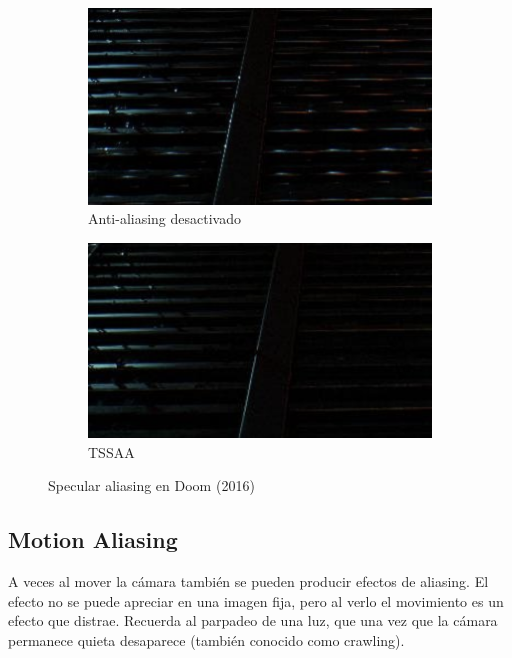 \documentclass[withindex, glossary]{cam-thesis}
\begin{document}
\begin{figure}[!htbp]
    \centering
    \begin{subfigure}[b]{0.8\textwidth}
        \includegraphics[width=\textwidth]{figures/specular-aliasing.png}
        \caption{Anti-aliasing desactivado}
    \end{subfigure}
    \centering
    \begin{subfigure}[b]{0.8\textwidth}
        \includegraphics[width=\textwidth]{figures/specular-fixed.png}
        \caption{TSSAA}
    \end{subfigure}
    \caption{Specular aliasing en Doom (2016)\label{specular}}
\end{figure}

\subsection{Motion Aliasing}

A veces al mover la cámara también se pueden producir efectos de aliasing. El efecto no se puede apreciar en una imagen fija, pero al verlo el movimiento es un efecto que distrae. Recuerda al parpadeo de una luz, que una vez que la cámara permanece quieta desaparece (también conocido como crawling).
\end{document}
